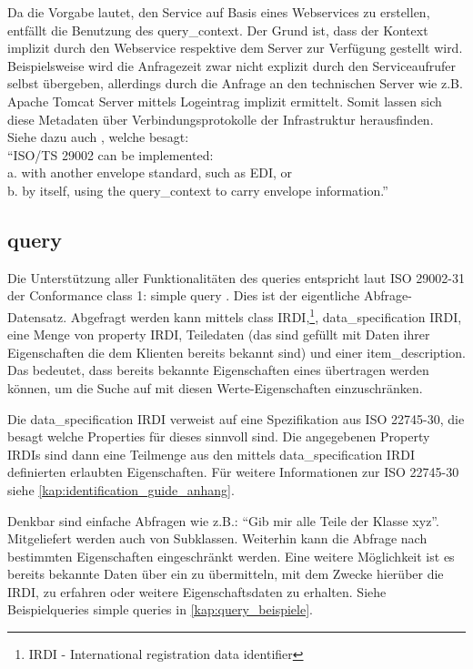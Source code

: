 Da die Vorgabe lautet, den Service auf Basis eines \glspl{Webservice} zu erstellen, entfällt die Benutzung des query\_context. Der Grund ist, dass der Kontext  implizit durch den \gls{Webservice} respektive dem Server zur Verfügung gestellt wird. Beispielsweise wird die Anfragezeit zwar nicht explizit durch den Serviceaufrufer selbst übergeben, allerdings durch die Anfrage an den technischen Server wie z.B. Apache Tomcat Server mittels Logeintrag implizit ermittelt. Somit lassen sich diese Metadaten über Verbindungsprotokolle der Infrastruktur herausfinden.  
Siehe dazu auch \citep[Kap. 6][]{iso29002-31}, welche besagt: \\ \enquote{ISO/TS 29002 can be implemented: \\
a. with another envelope standard, such as EDI, or \\
b. by itself, using the query\_context to carry envelope information.}

\subsection{query}\label{sec:query}
Die Unterstützung aller Funktionalitäten des queries entspricht laut ISO 29002-31 der Conformance class 1: simple query \citep[Anhang 6][]{iso29002-31}.
Dies ist der eigentliche Abfrage-Datensatz. Abgefragt werden kann mittels class \gls{IRDI},\footnote{IRDI  - International registration data identifier}, data\_specification IRDI, eine Menge von property \gls{IRDI}, Teiledaten (das sind  gefüllt mit Daten ihrer Eigenschaften die dem Klienten bereits bekannt sind) und einer item\_description. Das bedeutet, dass bereits bekannte Eigenschaften eines  übertragen werden können, um die Suche auf  mit diesen Werte-Eigenschaften einzuschränken.

Die data\_specification IRDI verweist auf eine Spezifikation aus ISO 22745-30, die besagt welche Properties für dieses  sinnvoll sind. Die angegebenen Property \glspl{IRDI} sind dann eine Teilmenge aus den mittels data\_specification IRDI definierten erlaubten Eigenschaften. Für weitere Informationen zur ISO 22745-30 siehe \autoref{kap:identification_guide_anhang}. 

Denkbar sind einfache Abfragen wie z.B.: \enquote{Gib mir alle Teile der Klasse xyz}. Mitgeliefert werden auch  von Subklassen. Weiterhin kann die Abfrage nach bestimmten Eigenschaften eingeschränkt werden. Eine weitere Möglichkeit ist es bereits bekannte Daten über ein  zu übermitteln, mit dem Zwecke hierüber die \gls{IRDI}, zu erfahren oder weitere Eigenschaftsdaten zu erhalten. Siehe Beispielqueries simple queries in \autoref{kap:query_beispiele}. 

